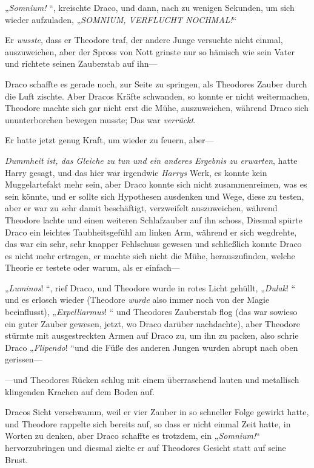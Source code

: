 {„\emph{Somnium!} “, kreischte Draco, und dann, nach zu wenigen Sekunden, um sich wieder aufzuladen, „\emph{SOMNIUM, VERFLUCHT NOCHMAL!}“

Er \emph{wusste}, dass er Theodore traf, der andere Junge versuchte nicht einmal, auszuweichen, aber der Spross von Nott grinste nur so hämisch wie sein Vater und richtete seinen Zauberstab auf ihn—

Draco schaffte es gerade noch, zur Seite zu springen, als Theodores Zauber durch die Luft zischte. Aber Dracos Kräfte schwanden, so konnte er nicht weitermachen, Theodore machte sich gar nicht erst die Mühe, auszuweichen, während Draco sich ununterborchen bewegen musste; Das war \emph{verrückt}.

Er hatte jetzt genug Kraft, um wieder zu feuern, aber—

\emph{Dummheit ist, das Gleiche zu tun und ein anderes Ergebnis zu erwarten}, hatte Harry gesagt, und das hier war irgendwie \emph{Harrys} Werk, es konnte kein Muggelartefakt mehr sein, aber Draco konnte sich nicht zusammenreimen, was es sein könnte, und er sollte sich Hypothesen ausdenken und Wege, diese zu testen, aber er war zu sehr damit beschäftigt, verzweifelt auszuweichen, während Theodore lachte und einen weiteren Schlafzauber auf ihn schoss, Diesmal spürte Draco ein leichtes Taubheitsgefühl am linken Arm, während er sich wegdrehte, das war ein sehr, sehr knapper Fehlschuss gewesen und schließlich konnte Draco es nicht mehr ertragen, er machte sich nicht die Mühe, herauszufinden, welche Theorie er testete oder warum, als er einfach—

„\emph{Luminos}! “, rief Draco, und Theodore wurde in rotes Licht gehüllt, „\emph{Dulak}! “ und es erlosch wieder (Theodore \emph{wurde} also immer noch von der Magie beeinflusst), „\emph{Expelliarmus}! “ und Theodores Zauberstab flog (das war sowieso ein guter Zauber gewesen, jetzt, wo Draco darüber nachdachte), aber Theodore stürmte mit ausgestreckten Armen auf Draco zu, um ihn zu packen, also schrie Draco „\emph{Flipendo}! “und die Füße des anderen Jungen wurden abrupt nach oben gerissen—

—und Theodores Rücken schlug mit einem überraschend lauten und metallisch klingenden Krachen auf dem Boden auf.

Dracos Sicht verschwamm, weil er vier Zauber in so schneller Folge gewirkt hatte, und Theodore rappelte sich bereits auf, so dass er nicht einmal Zeit hatte, in Worten zu denken, aber Draco schaffte es trotzdem, ein „\emph{Somnium!}“ hervorzubringen und diesmal zielte er auf Theodores Gesicht statt auf seine Brust.

}
